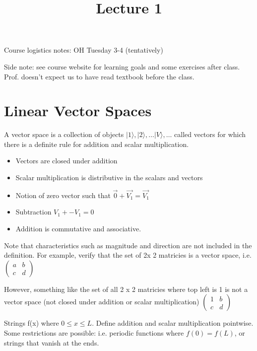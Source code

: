 \documentclass[11pt]{scrartcl}
\begin{document}
\title{Lecture 1}
\maketitle

Course logistics notes: OH Tuesday 3-4 (tentatively)

Side note: see course website for learning goals and some exercises after class. Prof. doesn't expect us to have read textbook before the class.
\section{Linear Vector Spaces}

\begin{definition}
A vector space is a collection of objects $ |1 \rangle , |2 \rangle , \ldots |V \rangle , \ldots  $ called vectors for which there is a definite rule for addition and scalar multiplication.
\begin{itemize}
	\item Vectors are closed under addition
	\item Scalar multiplication is distributive in the scalars and vectors
	\item Notion of zero vector such that $\vec{0} + \vec{V_1} = \vec{V_1}$
	\item Subtraction $V_1 + -V_1 = 0$
	\item Addition is commutative and associative.

	 
\end{itemize}
\end{definition}


Note that characteristics such as magnitude and direction are not included in the definition. For example, verify that the set of 2x 2 matricies is a vector space, i.e. $ \begin{pmatrix}
	a & b \\ c & d
\end{pmatrix}  $

However, something like the set of all 2 x 2 matricies where top left is 1 is not a vector space (not closed under addition or scalar multiplication) $ \begin{pmatrix}
	1 & b \\ c & d
\end{pmatrix}  $

\begin{example}
Strings f(x) where $ 0 \leq x \leq L $. Define addition and scalar multiplication pointwise. Some restrictions are possible: i.e. periodic functions where $ f(0) = f(L) $, or strings that vanish at the ends.
\end{example}
\end{document}
